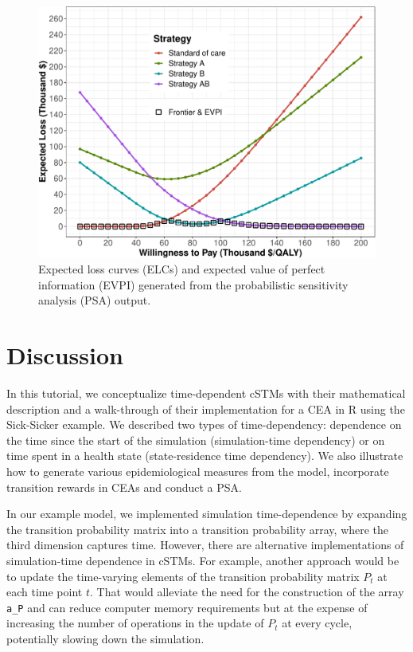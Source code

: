 \documentclass[
]{article}
\begin{document}
\begin{figure}[H]

{\centering \includegraphics{figs/ELC-AgeDep-1} 

}

\caption{Expected loss curves (ELCs) and expected value of perfect information (EVPI) generated from the probabilistic sensitivity analysis (PSA) output.}\label{fig:ELC-AgeDep}
\end{figure}

\hypertarget{discussion}{%
\section{Discussion}\label{discussion}}

In this tutorial, we conceptualize time-dependent cSTMs with their mathematical description and a walk-through of their implementation for a CEA in R using the Sick-Sicker example. We described two types of time-dependency: dependence on the time since the start of the simulation (simulation-time dependency) or on time spent in a health state (state-residence time dependency). We also illustrate how to generate various epidemiological measures from the model, incorporate transition rewards in CEAs and conduct a PSA.

In our example model, we implemented simulation time-dependence by expanding the transition probability matrix into a transition probability array, where the third dimension captures time. However, there are alternative implementations of simulation-time dependence in cSTMs. For example, another approach would be to update the time-varying elements of the transition probability matrix \(P_t\) at each time point \(t\). That would alleviate the need for the construction of the array \texttt{a\_P} and can reduce computer memory requirements but at the expense of increasing the number of operations in the update of \(P_t\) at every cycle, potentially slowing down the simulation.
\end{document}
